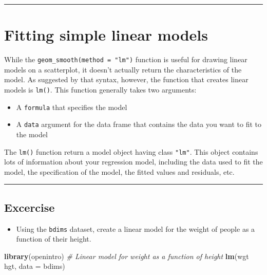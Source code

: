 \documentclass[
]{book}
\newenvironment{Shaded}{\begin{snugshade}}{\end{snugshade}}
\newcommand{\CommentTok}[1]{\textcolor[rgb]{0.56,0.35,0.01}{\textit{#1}}}
\newcommand{\DataTypeTok}[1]{\textcolor[rgb]{0.13,0.29,0.53}{#1}}
\newcommand{\KeywordTok}[1]{\textcolor[rgb]{0.13,0.29,0.53}{\textbf{#1}}}
\newcommand{\NormalTok}[1]{#1}
\newcommand{\OperatorTok}[1]{\textcolor[rgb]{0.81,0.36,0.00}{\textbf{#1}}}
\newcommand{\StringTok}[1]{\textcolor[rgb]{0.31,0.60,0.02}{#1}}
\providecommand{\tightlist}{%
  \setlength{\itemsep}{0pt}\setlength{\parskip}{0pt}}
\begin{document}
\begin{center}\rule{0.5\linewidth}{0.5pt}\end{center}

\hypertarget{fitting-simple-linear-models}{%
\section{Fitting simple linear models}\label{fitting-simple-linear-models}}

While the \texttt{geom\_smooth(method\ =\ "lm")} function is useful for drawing linear models on a scatterplot, it doesn't actually return the characteristics of the model. As suggested by that syntax, however, the function that creates linear models is \texttt{lm()}. This function generally takes two arguments:

\begin{itemize}
\item
  A \texttt{formula} that specifies the model
\item
  A \texttt{data} argument for the data frame that contains the data you want to fit to the model
\end{itemize}

The \texttt{lm()} function return a model object having class \texttt{"lm"}. This object contains lots of information about your regression model, including the data used to fit the model, the specification of the model, the fitted values and residuals, etc.

\begin{center}\rule{0.5\linewidth}{0.5pt}\end{center}

\hypertarget{excercise}{%
\subsection*{Excercise}\label{excercise}}

\begin{itemize}
\tightlist
\item
  Using the \texttt{bdims} dataset, create a linear model for the weight of people as a function of their height.
\end{itemize}

\begin{Shaded}
\begin{Highlighting}[]
\KeywordTok{library}\NormalTok{(openintro)}
\CommentTok{# Linear model for weight as a function of height}
\KeywordTok{lm}\NormalTok{(wgt }\OperatorTok{~}\StringTok{ }\NormalTok{hgt, }\DataTypeTok{data =}\NormalTok{ bdims)}
\end{Highlighting}
\end{Shaded}
\end{document}
